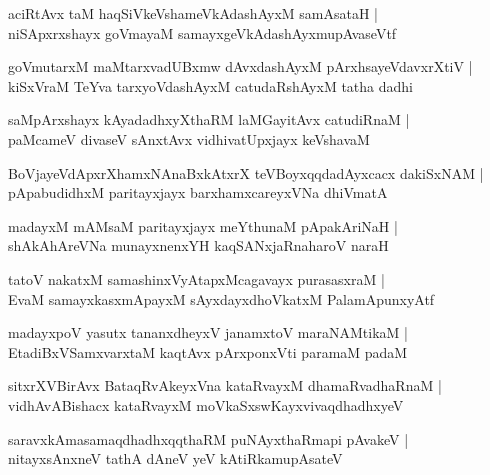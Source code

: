 \documentclass[twoside,12pt,openright]{book}
\newcounter{shloka}[chapter]
\begin{document}
\begin{shloka}%
aciRtAvx taM haqSiVkeVshameVkAdashAyxM samAsataH |\\
niSApxrxshayx goVmayaM samayxgeVkAdashAyxmupAvaseVtf 
\end{shloka}

\begin{shloka}%
goVmutarxM maMtarxvadUBxmw dAvxdashAyxM pArxhsayeVdavxrXtiV |\\
kiSxVraM TeYva tarxyoVdashAyxM catudaRshAyxM tatha dadhi 
\end{shloka}

\begin{shloka}%
saMpArxshayx kAyadadhxyXthaRM laMGayitAvx catudiRnaM |\\
paMcameV divaseV sAnxtAvx vidhivatUpxjayx keVshavaM 
\end{shloka}

\begin{shloka}%
BoVjayeVdApxrXhamxNAnaBxkAtxrX teVBoyxqqdadAyxcacx dakiSxNAM |\\
pApabudidhxM paritayxjayx barxhamxcareyxVNa dhiVmatA 
\end{shloka}

\begin{shloka}%
madayxM mAMsaM paritayxjayx meYthunaM pApakAriNaH |\\
shAkAhAreVNa munayxnenxYH kaqSANxjaRnaharoV naraH 
\end{shloka}

\begin{shloka}%
tatoV nakatxM samashinxVyAtapxMcagavayx purasasxraM |\\
EvaM samayxkasxmApayxM sAyxdayxdhoVkatxM PalamApunxyAtf 
\end{shloka}

\begin{shloka}%
madayxpoV yasutx tananxdheyxV janamxtoV maraNAMtikaM |\\
EtadiBxVSamxvarxtaM kaqtAvx pArxponxVti paramaM padaM 
\end{shloka}

\begin{shloka}%
sitxrXVBirAvx BataqRvAkeyxVna kataRvayxM dhamaRvadhaRnaM |\\
vidhAvABishacx kataRvayxM moVkaSxswKayxvivaqdhadhxyeV 
\end{shloka}

\begin{shloka}%
saravxkAmasamaqdhadhxqqthaRM puNAyxthaRmapi pAvakeV |\\
nitayxsAnxneV tathA dAneV yeV kAtiRkamupAsateV 
\end{shloka}
\end{document}
